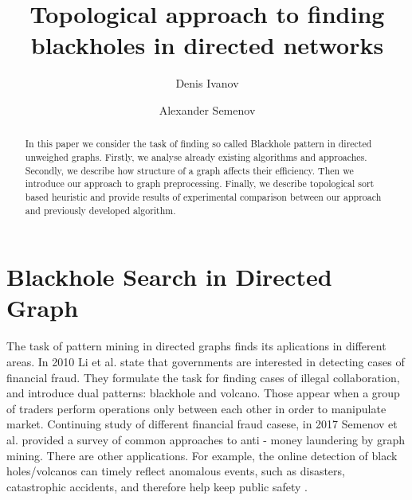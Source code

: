 \documentclass{svproc}
\begin{document}
\mainmatter              %
%
\title{Topological approach to finding blackholes in directed networks}
%
%
\author{Denis Ivanov \and Alexander Semenov}
%
%
%

\maketitle              %

\begin{abstract}
In this paper we consider the task of finding so called Blackhole pattern in directed unweighed graphs.
Firstly, we analyse already existing algorithms and approaches. Secondly, we describe how structure of a graph
affects their efficiency. Then we introduce our approach to graph preprocessing. Finally, we describe topological sort based heuristic
and provide results of experimental comparison between our approach and previously developed algorithm.
\end{abstract}

\section{Blackhole Search in Directed Graph}
The task of pattern mining in directed graphs finds its aplications in different areas. In 2010 Li et al.\cite{li2010mining} state
that governments are interested in detecting cases of financial fraud. They formulate the task for finding cases of illegal collaboration, and introduce dual patterns:
blackhole and volcano. Those appear when a group of traders perform operations only between each other in order to manipulate market.
Continuing study of different financial fraud casese, in 2017 Semenov et al. \cite{semenov2017survey} provided a survey of common approaches to anti - money laundering by graph mining.
There are other applications. For example, the online detection of black holes/volcanos can timely 
reflect anomalous events, such as disasters, catastrophic accidents, and therefore help keep public safety \cite{hong2015detecting}.
\end{document}
